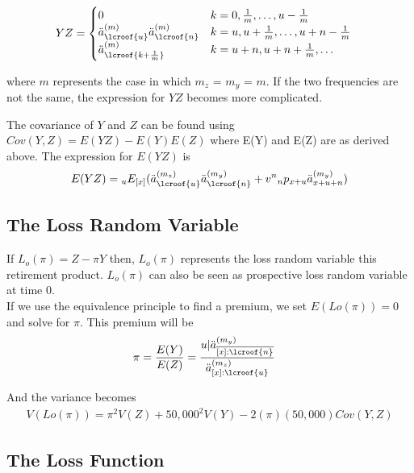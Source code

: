 \documentclass[12pt]{article}
\begin{document}
\begin{align*}
YZ &= 
\begin{cases}
0 & k=0,\frac{1}{m},\dots{}, u-\frac{1}{m} \\
\ddot{a}_{\lcroof{u}}^{(m)}\ddot{a}_{\lcroof{n}}^{(m)} & k=u,u+\frac{1}{m},\dots{},u+n-\frac{1}{m} \\
\ddot{a}_{\lcroof{k+\frac{1}{m}}}^{(m)} & k = u+n,u+n+\frac{1}{m}, \dots{}
\end{cases}
\end{align*}

where $m$ represents the case in which $m_z$ = $m_y$ = $m$. If the two frequencies are not the same, the expression for $YZ$ becomes more complicated.

The covariance of $Y$ and $Z$ can be found using $Cov(Y,Z) = E(YZ) - E(Y)E(Z)$ where E(Y) and E(Z) are as derived above. The expression for $E(YZ)$ is 
%
\begin{align*}
E(YZ) = \hspace{0mm}_uE_{[x]}(\ddot{a}_{\lcroof{u}}^{(m_z)}\ddot{a}_{\lcroof{n}}^{(m_y)}
+v^n\hspace{0mm}_np_{x+u}\ddot{a}_{x+u+n}^{(m_y)}
)
\end{align*}

\subsection{The Loss Random Variable}

If $L_o(\pi) = Z-\pi{Y}$ then, $L_o(\pi)$ represents the loss random variable this retirement product. $L_o(\pi)$ can also be seen as prospective loss random variable at time 0. \\

If we use the equivalence principle to find a premium, we set $E(Lo(\pi)) = 0$ and solve for $\pi$. This premium will be
%
\begin{align*}
\pi &= \frac{E(Y)}{E(Z)} = \frac{u|\ddot{a}_{\overline{[x]:\lcroof{n}}}^{(m_y)}}{\ddot{a}_{[x]:\lcroof{u}}^{(m_z)}}
\end{align*}

And the variance becomes
\begin{align*}
V(Lo(\pi)) = \pi^2V(Z) + 50,000^2 V(Y) - 2(\pi)(50,000)Cov(Y,Z)
\end{align*}

\subsection{The Loss Function}
\end{document}

